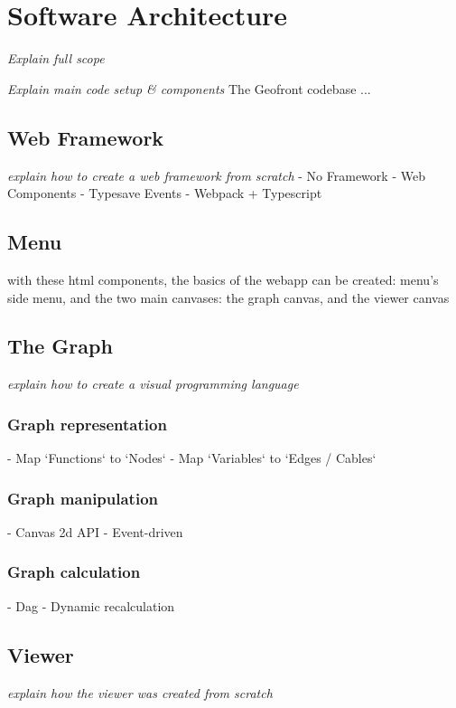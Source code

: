 \chapter{Software Architecture}
\emph{Explain full scope}


\emph{Explain main code setup \& components}
The Geofront codebase ...

\section{Web Framework}
\emph{explain how to create a web framework from scratch}
- No Framework
- Web Components
- Typesave Events
- Webpack + Typescript

\section{Menu}
with these html components, the basics of the webapp can be created: menu's side menu, and the two main canvases: the graph canvas, and the viewer canvas 

\section{The Graph}
\emph{explain how to create a visual programming language}
\subsection*{Graph representation}
  - Map `Functions` to `Nodes` 
  - Map `Variables` to `Edges / Cables`
\subsection*{Graph manipulation}
  - Canvas 2d API
  - Event-driven
\subsection*{Graph calculation}
  - Dag
  - Dynamic recalculation 

\section{Viewer}
\emph{explain how the viewer was created from scratch}

